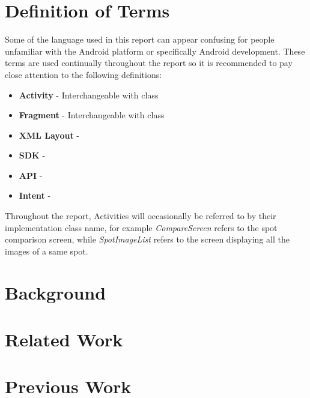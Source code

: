 \section{Definition of Terms}
Some of the language used in this report can appear confusing for people unfamiliar with the Android platform or specifically Android development. These terms are used continually throughout the report so it is recommended to pay close attention to the following definitions:
\begin{itemize}
    \item \textbf{Activity} - Interchangeable with class
    \item \textbf{Fragment} - Interchangeable with class
    \item \textbf{XML Layout} -
    \item \textbf{SDK} -
    \item \textbf{API} -
    \item \textbf{Intent} -
\end{itemize}

Throughout the report, Activities will occasionally be referred to by their implementation class name, for example \emph{CompareScreen} refers to the spot comparison screen, while \emph{SpotImageList} refers to the screen displaying all the images of a same spot.

\section{Background}

\section{Related Work}

\section{Previous Work}



